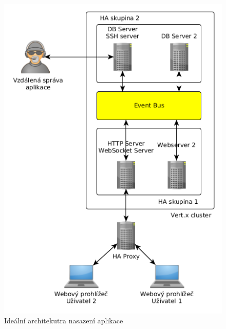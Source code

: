 \begin{figure}
\begin{centering}
\includegraphics[scale=0.5]{obrazky/architecture_ideal}
\par\end{centering}
\caption{Ideální architekutra nasazení aplikace\label{fig:architecture_ideal}}
\end{figure}
